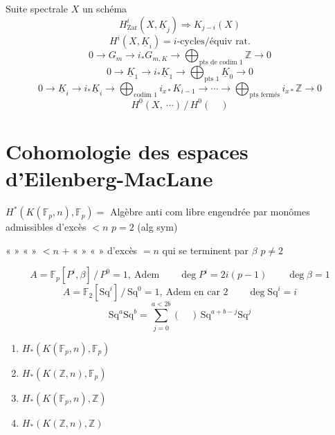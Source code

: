\documentclass[11pt,a4paper]{article}
\begin{document}
Suite spectrale \qquad $X$ un schéma
\[
  H^i_{\mathrm{Zar}}(X,\underline{K}_j) \Longrightarrow K_{j-i}(X)
\]
\[
  H^i(X,\underline{K}_i) = i\text{-cycles}/\text{équiv rat}.
\]
\[
  0 \to G_m \to i_{\ast}G_{m,K} \to \bigoplus_{\text{pts de codim } 1}\mathbb{Z} \to 0
\]
\[
  0 \to \underline{K}_1 \to i_{\ast}\underline{K}_1 \to \bigoplus_{\text{pts } 1}\underline{K}_0 \to 0
\]
\[
  0 \to \underline{K}_i \to i_{\ast}\underline{K}_i \to \bigoplus_{\text{codim } 1} i_{x\ast}K_{i-1}
  \to \cdots \to \bigoplus_{\text{pts fermés}} i_{x\ast}\mathbb{Z} \to 0
\]
\[
  H^0(X,\ \cdots)\,/\,H^0(\quad)
\]

\section{Cohomologie des espaces d'Eilenberg-MacLane}


$H^{\ast}(K(\mathbb{F}_p,n),\mathbb{F}_p) = {}$ Algèbre anti com libre engendrée
par monômes admissibles d'excès $<n$ \qquad $p=2$ (alg sym)

 « » \quad « » \quad $<n$ \quad $+$ « » \quad « » d'excès $= n$ qui se terminent par $\beta$ \qquad $p\neq 2$

\[
  A = \mathbb{F}_p[P^i,\beta]\,/\,P^0 = 1,\ \text{Adem}
  \qquad \deg P^i = 2i(p-1) \qquad \deg\beta = 1
\]
\[
  A = \mathbb{F}_2[\mathrm{Sq}^i]\,/\,\mathrm{Sq}^0 = 1,\ \text{Adem en car } 2
  \qquad \deg\mathrm{Sq}^i = i
\]
\[
  \mathrm{Sq}^a\mathrm{Sq}^b = \sum_{j=0}^{a<2b} (\quad)\,\mathrm{Sq}^{a+b-j}\mathrm{Sq}^j
\]


\begin{enumerate}
  \item $H_{\ast}(K(\mathbb{F}_p,n),\mathbb{F}_p)$
  \item $H_{\ast}(K(\mathbb{Z},n),\mathbb{F}_p)$
  \item $H_{\ast}(K(\mathbb{F}_p,n),\mathbb{Z})$
  \item $H_{\ast}(K(\mathbb{Z},n),\mathbb{Z})$
\end{enumerate}
\end{document}
